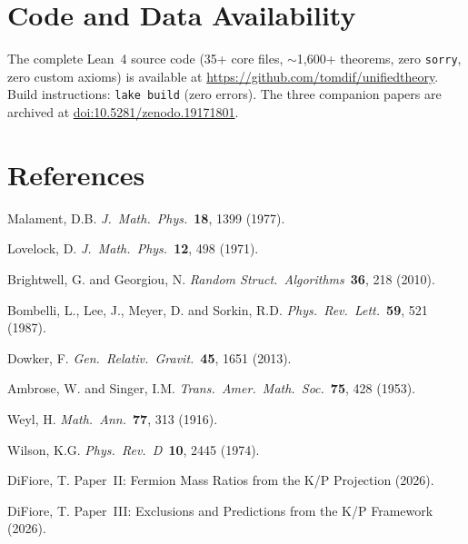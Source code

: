 \documentclass[11pt,letterpaper]{article}
\begin{document}
\section*{Code and Data Availability}

The complete Lean~4 source code (35+ core files, $\sim$1{,}600+ theorems,
zero \texttt{sorry}, zero custom axioms) is available at
\url{https://github.com/tomdif/unifiedtheory}.
Build instructions: \texttt{lake build} (zero errors).
The three companion papers are archived at
\href{https://doi.org/10.5281/zenodo.19171801}{doi:10.5281/zenodo.19171801}.

\section*{References}
\begin{enumerate}[label={[\arabic*]}]
  \item Malament, D.B. \textit{J.\ Math.\ Phys.}\ \textbf{18},
    1399 (1977).
  \item Lovelock, D. \textit{J.\ Math.\ Phys.}\ \textbf{12}, 498
    (1971).
  \item Brightwell, G. and Georgiou, N. \textit{Random Struct.\
    Algorithms}\ \textbf{36}, 218 (2010).
  \item Bombelli, L., Lee, J., Meyer, D. and Sorkin, R.D.
    \textit{Phys.\ Rev.\ Lett.}\ \textbf{59}, 521 (1987).
  \item Dowker, F. \textit{Gen.\ Relativ.\ Gravit.}\
    \textbf{45}, 1651 (2013).
  \item Ambrose, W. and Singer, I.M. \textit{Trans.\ Amer.\ Math.\
    Soc.}\ \textbf{75}, 428 (1953).
  \item Weyl, H. \textit{Math.\ Ann.}\ \textbf{77}, 313 (1916).
  \item Wilson, K.G. \textit{Phys.\ Rev.\ D}\ \textbf{10}, 2445
    (1974).
  \item DiFiore, T. Paper~II: Fermion Mass Ratios from the K/P
    Projection (2026).
  \item DiFiore, T. Paper~III: Exclusions and Predictions from
    the K/P Framework (2026).
\end{enumerate}
\end{document}
